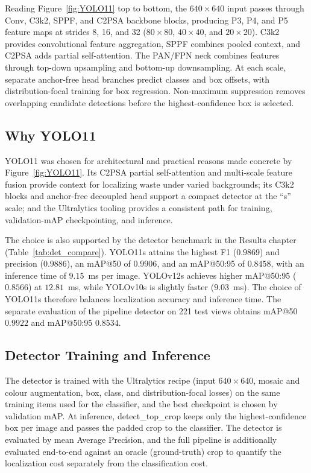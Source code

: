 Reading Figure~\ref{fig:YOLO11} top to bottom, the $640\times640$ input passes through Conv, C3k2, SPPF, and C2PSA backbone blocks, producing P3, P4, and P5 feature maps at strides 8, 16, and 32 ($80\times80$, $40\times40$, and $20\times20$). C3k2 provides convolutional feature aggregation, SPPF combines pooled context, and C2PSA adds partial self-attention. The PAN/FPN neck combines features through top-down upsampling and bottom-up downsampling. At each scale, separate anchor-free head branches predict classes and box offsets, with distribution-focal training for box regression. Non-maximum suppression removes overlapping candidate detections before the highest-confidence box is selected.

\subsection{Why YOLO11}
YOLO11 was chosen for architectural and practical reasons made concrete by Figure~\ref{fig:YOLO11}. Its C2PSA partial self-attention and multi-scale feature fusion provide context for localizing waste under varied backgrounds; its C3k2 blocks and anchor-free decoupled head support a compact detector at the ``s'' scale; and the Ultralytics tooling provides a consistent path for training, validation-mAP checkpointing, and inference.

The choice is also supported by the detector benchmark in the Results chapter (Table~\ref{tab:det_compare}). YOLO11s attains the highest F1 ($0.9869$) and precision ($0.9886$), an mAP@50 of $0.9906$, and an mAP@50:95 of $0.8458$, with an inference time of $9.15$~ms per image. YOLOv12s achieves higher mAP@50:95 ($0.8566$) at $12.81$~ms, while YOLOv10s is slightly faster ($9.03$~ms). The choice of YOLO11s therefore balances localization accuracy and inference time. The separate evaluation of the pipeline detector on 221 test views obtains mAP@50 $0.9922$ and mAP@50:95 $0.8534$.

\subsection{Detector Training and Inference}
The detector is trained with the Ultralytics recipe (input $640\times640$, mosaic and colour augmentation, box, class, and distribution-focal losses) on the same training items used for the classifier, and the best checkpoint is chosen by validation mAP. At inference, detect\_top\_crop keeps only the highest-confidence box per image and passes the padded crop to the classifier. The detector is evaluated by mean Average Precision, and the full pipeline is additionally evaluated end-to-end against an oracle (ground-truth) crop to quantify the localization cost separately from the classification cost.

